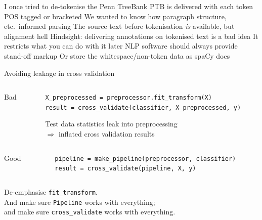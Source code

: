 \documentclass[aspectratio=169, 22pt]{beamer}
\newcommand{\hl}{\textcolor{usydred}}
\begin{document}
\begin{points}{I once tried to de-tokenise the Penn TreeBank}
	\p PTB is delivered with each token POS tagged or bracketed
	\p We wanted to know how paragraph structure, etc.\ informed parsing
	\p The source text before tokenisation \emph{is} available, but
	\p[$\Rightarrow$] alignment hell
	\vfill
	\p Hindsight: delivering annotations on tokenised text is a bad idea
	\p It restricts what you can do with it later
	\p NLP software should always provide stand-off markup
	\p Or store the whitespace/non-token data as spaCy does
\end{points}

\begin{plain}{Avoiding leakage in cross validation}
	\begin{columns}[t]\begin{column}{0.1\textwidth}Bad\end{column}\begin{column}{.9\textwidth}
\verb|X_preprocessed = preprocessor.fit_transform(X)|\\
\verb|result = cross_validate(classifier, X_preprocessed, y)|

	\vspace{1em}
Test data statistics \hl{leak} into preprocessing\\
	$\Rightarrow$ inflated cross validation results
	\end{column}\end{columns}
	\vspace{1em}

	\begin{columns}[t]\begin{column}{0.1\textwidth}Good\end{column}\begin{column}{.9\textwidth}
\verb|pipeline = make_pipeline(preprocessor, classifier)|\\
\verb|result = cross_validate(pipeline, X, y)|
	\end{column}\end{columns}

	\vfill
	\pause
	\begin{itemize}
			\p[Solution] De-emphasise \verb|fit_transform|.\\
			And make sure \verb|Pipeline| works with everything;\\
			and make sure \verb|cross_validate| works with everything.
	\end{itemize}
\end{plain}
\end{document}
